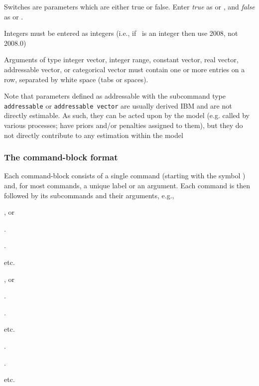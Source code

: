 Switches are parameters which are either true or false. Enter \emph{true} as  or , and \emph{false} as  or . 

Integers must be entered as integers (i.e., if \ is an integer then use 2008, not 2008.0)

Arguments of type integer vector, integer range, constant vector, real vector, addressable vector, or categorical vector must contain one or more entries on a row, separated by white space (tabs or spaces). 

Note that parameters defined as addressable with the subcommand type \texttt{addressable} or \texttt{addressable vector} are usually derived IBM and are not directly estimable. As such, they can be acted upon by the model (e.g. called by various processes; have priors and/or penalties assigned to them), but they do not directly contribute to any estimation within the model

\subsubsection{The command-block format}
Each command-block consists of a single command (starting with the symbol \command{}) and, for most commands, a unique label or an argument. Each command is then followed by its subcommands and their arguments, e.g., 

\begin{multicols}{3}
	\begin{description}
		\item {}, or
		\item {} 
		\item {} 
		\item .
		\item .
		\item etc.
		\item {} , or
		\item {} 
		\item {} 
		\item .
		\item .
		\item etc.
		\item {} 
		\item {} 
		\item {} 
		\item .
		\item .
		\item etc.
		\end{description}
	\end{multicols}


